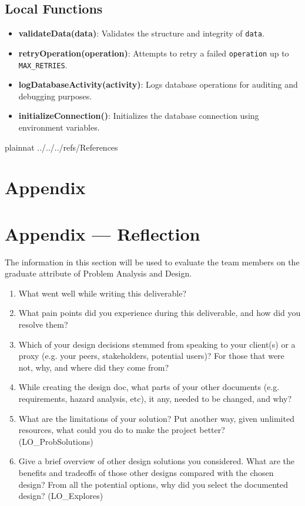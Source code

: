 \documentclass[12pt, titlepage]{article}
\begin{document}
\subsection{Local Functions}
\begin{itemize}
    \item \textbf{validateData(data)}: Validates the structure and integrity of \texttt{data}.
    \item \textbf{retryOperation(operation)}: Attempts to retry a failed \texttt{operation} up to \texttt{MAX\_RETRIES}.
    \item \textbf{logDatabaseActivity(activity)}: Logs database operations for auditing and debugging purposes.
    \item \textbf{initializeConnection()}: Initializes the database connection using environment variables.
\end{itemize}

 {plainnat}
 {../../../refs/References}

\newpage

\section{Appendix} \label{Appendix}


\newpage{}

\section*{Appendix --- Reflection}

The information in this section will be used to evaluate the team members on the
graduate attribute of Problem Analysis and Design.



\begin{enumerate}
  \item What went well while writing this deliverable? 
  \item What pain points did you experience during this deliverable, and how
    did you resolve them?
  \item Which of your design decisions stemmed from speaking to your client(s)
  or a proxy (e.g. your peers, stakeholders, potential users)? For those that
  were not, why, and where did they come from?
  \item While creating the design doc, what parts of your other documents (e.g.
  requirements, hazard analysis, etc), it any, needed to be changed, and why?
  \item What are the limitations of your solution?  Put another way, given
  unlimited resources, what could you do to make the project better? (LO\_ProbSolutions)
  \item Give a brief overview of other design solutions you considered.  What
  are the benefits and tradeoffs of those other designs compared with the chosen
  design?  From all the potential options, why did you select the documented design?
  (LO\_Explores)
\end{enumerate}
\end{document}
